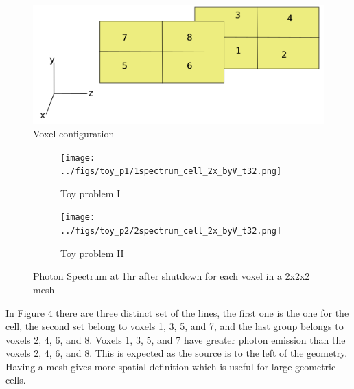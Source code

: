 \begin{figure}[h]
\begin{centering}
\includegraphics[width=0.60\linewidth]{../figs/voxels.png}
\caption{Voxel configuration}
\label{voxels}
\end{centering}
\end{figure}

\begin{figure}[h]
 \begin{centering}
 \centering
 \begin{subfigure}[b]{.45\textwidth}
 \texttt{[image: ../figs/toy\_p1/1spectrum\_cell\_2x\_byV\_t32.png]}
 \caption{Toy problem I }
 \label{1spect_cell_2x_byV}
 \end{subfigure}
 \hspace{0.05cm}
 \begin{subfigure}[b]{.45\textwidth}
 \centering
 \texttt{[image: ../figs/toy\_p2/2spectrum\_cell\_2x\_byV\_t32.png]}
 \caption{Toy problem II}
 \label{2spect_cell_2x_byV}
 \end{subfigure}
 \caption{Photon Spectrum at 1hr after shutdown for each voxel in a 2x2x2 mesh}
 \label{spect_cell_2x_byV}
 \end{centering}
\end{figure}
In Figure \ref{spect_cell_2x_byV} there are three distinct set of the lines, the 
first one is the one for the cell, the second set belong to voxels 1, 3, 5, and 7, and the 
last group belongs to voxels 2, 4, 6, and 8. Voxels 1, 3, 5, and 7 have greater photon emission 
than the voxels 2, 4, 6, and 8. This is expected as the source is to the left of the geometry. 
Having a mesh gives more spatial definition which is useful for large geometric cells. 
\newpage
